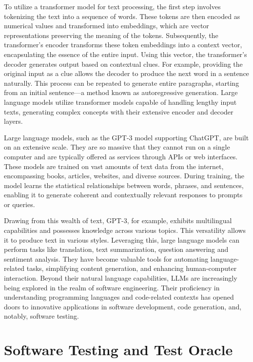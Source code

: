 To utilize a transformer model for text processing, the first step involves tokenizing the text into a sequence of words. These tokens are then encoded as numerical values and transformed into embeddings, which are vector representations preserving the meaning of the tokens. Subsequently, the transformer's encoder transforms these token embeddings into a context vector, encapsulating the essence of the entire input. Using this vector, the transformer's decoder generates output based on contextual clues. For example, providing the original input as a clue allows the decoder to produce the next word in a sentence naturally. This process can be repeated to generate entire paragraphs, starting from an initial sentence—a method known as autoregressive generation. Large language models utilize transformer models capable of handling lengthy input texts, generating complex concepts with their extensive encoder and decoder layers.

Large language models, such as the GPT-3 model supporting ChatGPT, are built on an extensive scale. They are so massive that they cannot run on a single computer and are typically offered as services through APIs or web interfaces. These models are trained on vast amounts of text data from the internet, encompassing books, articles, websites, and diverse sources. During training, the model learns the statistical relationships between words, phrases, and sentences, enabling it to generate coherent and contextually relevant responses to prompts or queries.

Drawing from this wealth of text, GPT-3, for example, exhibits multilingual capabilities and possesses knowledge across various topics. This versatility allows it to produce text in various styles. Leveraging this, large language models can perform tasks like translation, text summarization, question answering and sentiment analysis. They have become valuable tools for automating language-related tasks, simplifying content generation, and enhancing human-computer interaction. Beyond their natural language capabilities, LLMs are increasingly being explored in the realm of software engineering. Their proficiency in understanding programming languages and code-related contexts has opened doors to innovative applications in software development, code generation, and, notably, software testing.

\section{Software Testing and Test Oracle}
\label{sec:software_testing_and_oracle}
\vspace{0.2 cm}

